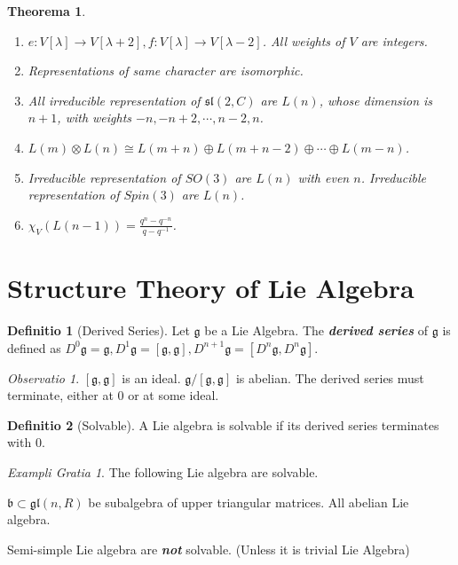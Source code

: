\documentclass[12pt, a4paper]{article}
\newtheorem{theorem}{Theorema}[section]
\theoremstyle{definition}
\newtheorem{definition}{Definitio}[section]
\theoremstyle{remark}
\newtheorem{remark}{Observatio}[section]
\newtheorem{example}{Exampli Gratia}[section]
\renewcommand{\emph}[1]{\textbf{\textit{#1}}}
\newcommand{\gl}{\mathfrak{gl}}
\renewcommand{\sl}{\mathfrak{sl}}
\newcommand{\mf}[1]{\mathfrak{#1}}
\begin{document}
\begin{theorem}
	\ 
	\begin{enumerate}
		\item $e: V[\lambda] \rightarrow  V[\lambda + 2], f: V[\lambda] \rightarrow  V[\lambda - 2]$.
			All weights of $V$ are integers.
		\item Representations of same character are isomorphic.
		\item All irreducible representation of $\sl(2, C)$ are $L(n)$, whose dimension is $n+1$, with weights $-n, -n+2, \cdots, n-2, n$. 
		\item $L(m) \otimes L(n) \cong L(m+n) \oplus L(m+n-2) \oplus \cdots \oplus L(m-n)$.
		\item Irreducible representation of $SO(3)$ are $L(n)$ with even $n$. Irreducible representation of $Spin(3)$ are $L(n)$.
		\item $\chi_V(L(n-1)) = \frac{q^n - q^{-n}}{q-q^{-1}}$.
	\end{enumerate}
\end{theorem}

\section{Structure Theory of Lie Algebra}

\begin{definition}[Derived Series]
	Let $\mathfrak{g}$ be a Lie Algebra. The \emph{derived series} of $\mathfrak{g}$ is defined as 
	$D^0\mathfrak{g} = \mathfrak{g}, D^1\mathfrak{g} = [\mathfrak{g}, \mathfrak{g}], D^{n+1}\mathfrak{g} = [D^n\mathfrak{g}, D^n\mathfrak{g}].$ 
\end{definition}

\begin{remark}
	$[\mf{g}, \mf{g}]$ is an ideal. $\mf{g}/ [\mf{g}, \mf{g}]$ is abelian.
	The derived series must terminate, either at $0$ or at some ideal.
\end{remark}

\begin{definition}[Solvable]
	A Lie algebra is solvable if its derived series terminates with $0$.
\end{definition}

\begin{example}

	The following Lie algebra are solvable.

	$\mf{b} \subset \gl(n, R)$ be subalgebra of upper triangular matrices. 
	All abelian Lie algebra.

	Semi-simple Lie algebra are \emph{not} solvable. (Unless it is trivial Lie Algebra)
\end{example}
\end{document}
